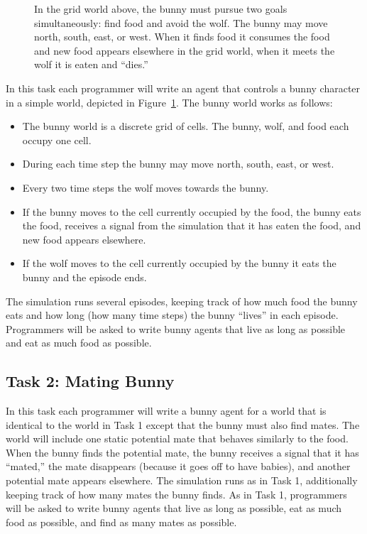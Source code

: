 \begin{appendices}
\begin{figure}[h]
\caption{In the grid world above, the bunny must pursue two goals
  simultaneously: find food and avoid the wolf.  The bunny may move
  north, south, east, or west.  When it finds food it consumes the
  food and new food appears elsewhere in the grid world, when it meets
  the wolf it is eaten and ``dies.''}
\label{fig:bunny-picture}
\end{figure}

In this task each programmer will write an agent that controls a bunny character in a simple
world, depicted in Figure~\ref{fig:bunny-picture}.  The bunny world works as follows:

\begin{itemize}

\item The bunny world is a discrete grid of cells.  The bunny, wolf, and food each occupy one cell.

\item During each time step the bunny may move north, south, east, or west.

\item Every two time steps the wolf moves towards the bunny.

\item If the bunny moves to the cell currently occupied by the food, the bunny eats the food, receives a signal from the simulation that it has eaten the food, and new food appears elsewhere.

\item If the wolf moves to the cell currently occupied by the bunny it eats the bunny and the episode ends.

\end{itemize}

The simulation runs several episodes, keeping track of how much food the bunny eats and how long (how many time steps) the bunny ``lives'' in each episode.  Programmers will be asked to write bunny agents that live as long as possible and eat as much food as possible.

\subsection{Task 2: Mating Bunny}\label{sec:task2}

In this task each programmer will write a bunny agent for a world that is identical to the world in Task 1 except that the bunny must also find mates.  The world will include one static  potential mate that behaves similarly to the food.  When the bunny finds the potential mate, the bunny receives a signal that it has ``mated,'' the mate disappears (because it goes off to have babies), and another potential mate appears elsewhere.  The simulation runs as in Task 1, additionally keeping track of how many mates the bunny finds.  As in Task 1, programmers will be asked to write bunny agents that live as long as possible, eat as much food as possible, and find as many mates as possible.


\end{appendices}
